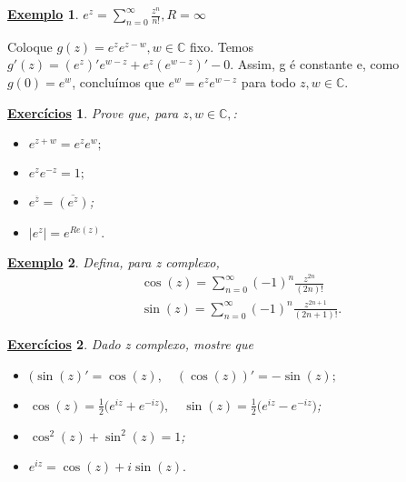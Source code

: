 \documentclass{article}
\newtheorem{example}{\underline{Exemplo}}[section]
\newtheorem*{exer*}{\underline{Exerc\'icios}}
\begin{document}
  \begin{example}
    $e^z = \sum_{n=0}^{\infty}\frac{z^n}{n!}, R = \infty$
  \end{example}
  Coloque $g(z) = e^ze^{z-w}, w\in\mathbb{C}$ fixo. Temos $g'(z) = (e^z)'e^{w-z} + e^z(e^{w-z})' - 0.$
  Assim, g \'e constante e, como $g(0) = e^w$, conclu\'imos que $e^w = e^ze^{w-z}$ para todo
  $z, w\in\mathbb{C}$.
  \begin{exer*}
    Prove que, para $z, w\in\mathbb{C},$:
    \begin{itemize}
      \item[1)] $e^{z+w} = e^ze^w;$
      \item[2)] $e^ze^{-z} = 1;$
      \item[3)] $e^{\overline{z}} = \overline{(e^z)}$;
      \item[4)] $|e^z| = e^{Re(z)}.$
    \end{itemize}
  \end{exer*}
  \begin{example}
    Defina, para z complexo,
    \begin{align*}
  &\cos{(z)} = \sum_{n=0}^{\infty}(-1)^n\frac{z^{2n}}{(2n)!} \\
  &\sin{(z)} = \sum_{n=0}^{\infty}(-1)^n\frac{z^{2n+1}}{(2n+1)!}.
    \end{align*}
  \end{example}
  \begin{exer*}
    Dado z complexo, mostre que
    \begin{itemize}
      \item[i)] $(\sin{(z)}' = \cos{(z)}, \quad (\cos{(z)})' = -\sin{(z)};$
      \item[ii)] $\cos{(z)} = \frac{1}{2}\biggl(e^{iz} + e^{-iz}\biggr), \quad \sin{(z)} = \frac{1}{2}
        \biggl(e^{iz} - e^{-iz}\biggr)$; 
      \item[iii)] $\cos^2{(z)} + \sin^2{(z)} = 1$;
      \item[iv)] $e^{iz} = \cos{(z)} + i\sin{(z)}.$ 
    \end{itemize}
  \end{exer*}
\end{document}
